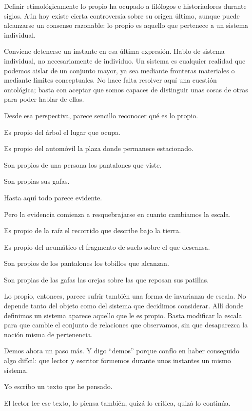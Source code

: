 \documentclass[11pt,a4paper]{article}
\begin{document}
Definir etimológicamente lo propio ha ocupado a filólogos e historiadores durante siglos. Aún hoy existe cierta controversia sobre su origen último, aunque puede alcanzarse un consenso razonable: lo propio es aquello que pertenece a un sistema individual.

Conviene detenerse un instante en esa última expresión. Hablo de sistema individual, no necesariamente de individuo. Un sistema es cualquier realidad que podemos aislar de un conjunto mayor, ya sea mediante fronteras materiales o mediante límites conceptuales. No hace falta resolver aquí una cuestión ontológica; basta con aceptar que somos capaces de distinguir unas cosas de otras para poder hablar de ellas.

Desde esa perspectiva, parece sencillo reconocer qué es lo propio.

Es propio del árbol el lugar que ocupa.

Es propio del automóvil la plaza donde permanece estacionado.

Son propios de una persona los pantalones que viste.

Son propias sus gafas.

Hasta aquí todo parece evidente.

Pero la evidencia comienza a resquebrajarse en cuanto cambiamos la escala.

Es propio de la raíz el recorrido que describe bajo la tierra.

Es propio del neumático el fragmento de suelo sobre el que descansa.

Son propios de los pantalones los tobillos que alcanzan.

Son propias de las gafas las orejas sobre las que reposan sus patillas.

Lo propio, entonces, parece sufrir también una forma de invarianza de escala. No depende tanto del objeto como del sistema que decidimos considerar. Allí donde definimos un sistema aparece aquello que le es propio. Basta modificar la escala para que cambie el conjunto de relaciones que observamos, sin que desaparezca la noción misma de pertenencia.

Demos ahora un paso más. Y digo ``demos'' porque confío en haber conseguido algo difícil: que lector y escritor formemos durante unos instantes un mismo sistema.

Yo escribo un texto que he pensado.

El lector lee ese texto, lo piensa también, quizá lo critica, quizá lo continúa.
\end{document}
